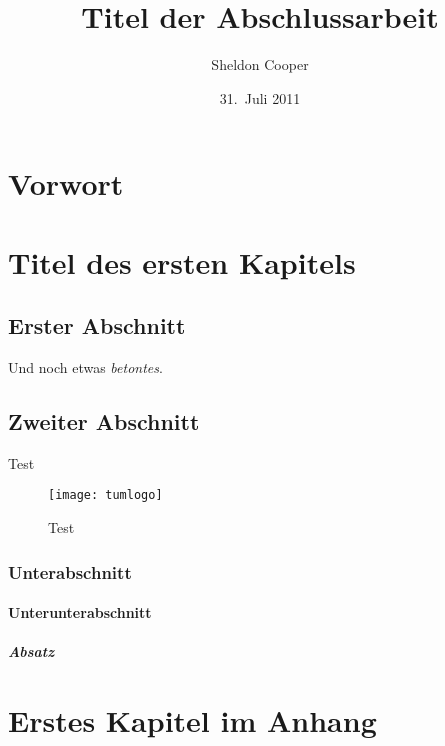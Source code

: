 \documentclass[encoding=utf8,british]{tumphthesis}
\title{Titel der Abschlussarbeit}
\author{Sheldon Cooper}
\date{31.~Juli 2011}
\begin{document}

\frontmatter
\maketitle
\tableofcontents

\chapter{Vorwort}
\lipsum[1]

\mainmatter
\chapter{Titel des ersten Kapitels}
\section{Erster Abschnitt}
\lipsum[2-5]\cite{schwabl-qqi2002}

Und noch etwas \emph{betontes}.

\section{Zweiter Abschnitt}
\lipsum[6] Test\cite{Setare:2013dra}
\begin{figure}
	\centering
	\texttt{[image: tumlogo]}
	\caption{\label{fig:test}Test}
\end{figure}
\subsection{Unterabschnitt}
\lipsum[7]\cite{schwabl-qqi2002,schwabl-qffi2002}
\subsubsection{Unterunterabschnitt}
\paragraph{Absatz} \lipsum[8]

\appendix
\chapter{Erstes Kapitel im Anhang}
\lipsum[9-20]

\backmatter
\printbibliography
\end{document}
